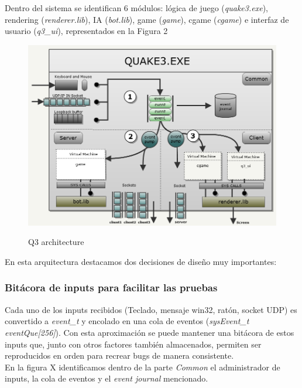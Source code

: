 \documentclass[a4paper,12pt]{report}
\begin{document}
	Dentro del sistema se identifican 6 módulos: lógica de juego (\textit{quake3.exe}), rendering (\textit{renderer.lib}), IA (\textit{bot.lib}), game (\textit{game}), cgame (\textit{cgame}) e interfaz de usuario (\textit{q3\_ui}), representados en la Figura 2  

		\begin{center}
			\begin{figure}[h]
				\includegraphics[width=1\textwidth]{images/q3_architecture}
				\label{fig:architecture}
				\caption{Q3 architecture}
			\end{figure}
		\end{center}
	
	En esta arquitectura destacamos dos decisiones de diseño muy importantes:
	
	\subsubsection{Bitácora de inputs para facilitar las pruebas}
	
	Cada uno de los inputs recibidos (Teclado, mensaje win32, ratón, socket UDP) es convertido a \textit{event\_t} y encolado en una cola de eventos (\textit{sysEvent\_t eventQue[256]}). Con esta aproximación se puede mantener una bitácora de estos inputs que, junto con otros factores también almacenados, permiten ser reproducidos en orden para recrear bugs de manera consistente. \cite{johncplan}\\
	
	En la figura X identificamos dentro de la parte \textit{Common} el administrador de inputs, la cola de eventos y el \textit{event journal} mencionado.
	
\end{document}
